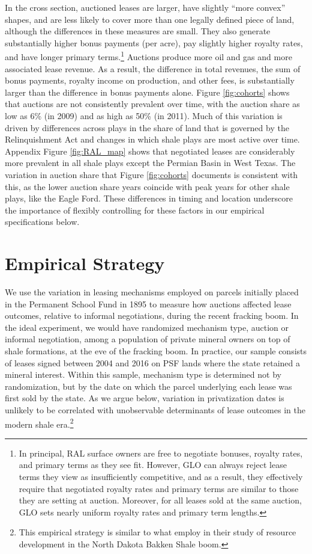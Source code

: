 \documentclass[12pt]{article}
\begin{document}
In the cross section, auctioned leases are larger, have slightly ``more convex'' shapes, and are less likely to cover more than one legally defined piece of land, although the differences in these measures are small. They also generate substantially higher bonus payments (per acre), pay slightly higher royalty rates, and have longer primary terms.\footnote{In principal, RAL surface owners are free to negotiate bonuses, royalty rates, and primary terms as they see fit.  However, GLO can always reject lease terms they view as insufficiently competitive, and as a result, they effectively require that negotiated royalty rates and primary terms are similar to those they are setting at auction.  Moreover, for all leases sold at the same auction, GLO sets nearly uniform royalty rates and primary term lengths.} Auctions produce more oil and gas and more associated lease revenue.  As a result, the difference in total revenues, the sum of bonus payments, royalty income on production, and other fees, is substantially larger than the difference in bonus payments alone.  Figure \ref{fig:cohorts} shows that auctions are not consistently prevalent over time, with the auction share as low as 6\% (in 2009) and as high as 50\% (in 2011).  Much of this variation is driven by differences across plays in the share of land that is governed by the Relinquishment Act and changes in which shale plays are most active over time.  Appendix Figure \ref{fig:RAL_map} shows that negotiated leases are considerably more prevalent in all shale plays except the Permian Basin in West Texas.  The variation in auction share that Figure \ref{fig:cohorts} documents is consistent with this, as the lower auction share years coincide with peak years for other shale plays, like the Eagle Ford.  These differences in timing and location underscore the importance of flexibly controlling for these factors in our empirical specifications below. 

\section{Empirical Strategy \label{sec:EmpiricalStrategy}}

We use the variation in leasing mechanisms employed on parcels initially placed in the Permanent School Fund in 1895 to measure how auctions affected lease outcomes, relative to informal negotiations, during the recent fracking boom. In the ideal experiment, we would have randomized mechanism type, auction or informal negotiation, among a population of private mineral owners on top of shale formations, at the eve of the fracking boom. In practice, our sample consists of leases signed between 2004 and 2016 on PSF lands where the state retained a mineral interest. Within this sample, mechanism type is determined not by randomization, but by the date on which the parcel underlying each lease was first sold by the state. As we argue below, variation in privatization dates is unlikely to be correlated with unobservable determinants of lease outcomes in the modern shale era.\footnote{This empirical strategy is similar to what \cite{leonard2021fragmented} employ in their study of resource development in the North Dakota Bakken Shale boom.}
\end{document}
